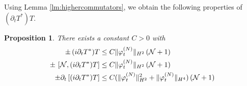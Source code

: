 \documentclass[11pt,a4paper]{article}
\newtheorem{proposition}[thm]{Proposition}
\newcommand{\cN}{{\cal N}}
\begin{document}
Using Lemma \ref{lm:highercommutators}, we obtain the following properties of $(\partial_t T^*)T$.
\begin{proposition}
There exists a constant $C>0$ with 
\begin{equation}\begin{split}
\label{eq:prT-cl1}  \pm \, (i\partial_t T^*) T &\leq C \| \varphi_t^{(N)} \|_{H^2} \,  (\cN +1) \\
\pm \, \left[ \cN , (i\partial_t T^*) T \right]  &\leq C \| \varphi_t^{(N)} \|_{H^2} \, (\cN + 1) \\
\pm \partial_t \left[ (i\partial_t T^*) T \right] &\leq C (\| \varphi_t^{(N)} \|^2_{H^2} + \| \varphi_t^{(N)} \|_{H^4}) \, (\cN +1) 
\end{split}
\end{equation}
\end{proposition}
\end{document}
